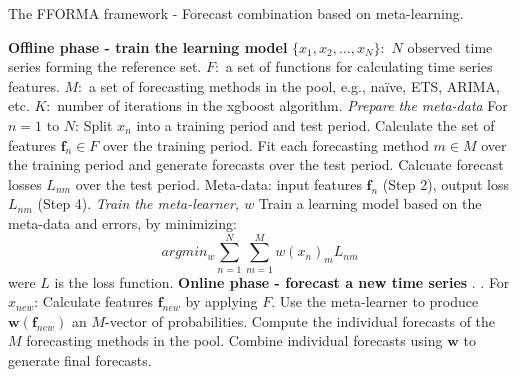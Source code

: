 \documentclass[11pt,a4paper,]{article}
\def\naive{na\"{i}ve}
\theoremstyle{definition}
\theoremstyle{definition}
\theoremstyle{definition}
\theoremstyle{remark}
\begin{document}
\begin{algorithm}[!ht]
  \caption{The FFORMA framework - Forecast combination based on meta-learning. }
  \label{alg:algo-lab}
  \begin{algorithmic}[1]
    \Statex \textbf{Offline phase - train the learning model}
    \Statex {}
    \Statex \hspace{1cm}$\{x_1, x_2, \dots,x_N\}:$ $N$ observed time series forming the reference set.
         \Statex \hspace{1cm}$F:$ a set of functions for calculating time series features.
         \Statex \hspace{1cm}$M:$ a set of forecasting methods in the pool, e.g., \naive, ETS, ARIMA, etc.
           \Statex \hspace{1cm}$K:$ number of iterations in the xgboost algorithm.
     \Statex {}
      \Statex \hspace{1cm}
      \Statex {}\vspace{0.3cm}
    \Statex \textit{Prepare the meta-data} \vspace{0.1cm}
    \Statex For $n=1$ to $N$:
            \State Split $x_n$ into a training period and test period.
            \State Calculate the set of features $\bm{f}_n\in F$ over the training period.
            \State Fit each forecasting method $m\in M$ over the training period and generate forecasts over the test period.
            \State Calcuate forecast losses $L_{nm}$ over the test period.
    \State Meta-data: input features $\bm{f}_n$ (Step 2), output loss $L_{nm}$ (Step 4).
     \Statex
    \Statex \textit{Train the meta-learner, $w$}  \vspace{0.1cm}
            \State Train a learning model based on the meta-data and errors, by minimizing:
            $$ argmin_w \sum_{n=1}^N \sum_{m=1}^M w(x_n)_{m} L_{nm}$$ were $L$ is the loss function.
    \Statex
     \Statex \textbf{Online phase - forecast a new time series}
    \Statex {}
    \Statex \hspace{1cm}.
     \Statex {}
      \Statex \hspace{1cm}.
      \Statex For $x_{new}$: 
  \State Calculate features $\bm{f}_{new}$ by applying $F$.
  \State Use the meta-learner to produce $\bm{w}(\bm{f}_{new})$ an $M$-vector of probabilities.
  \State Compute the individual forecasts of the $M$ forecasting methods in the pool.
  \State Combine individual forecasts using $\bm{w}$ to generate final forecasts.
   \end{algorithmic}

\end{algorithm}
\end{document}
